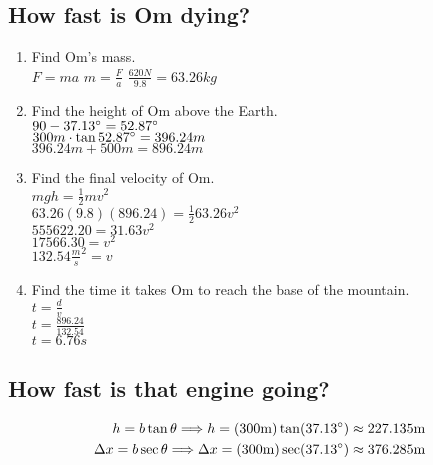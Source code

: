 \documentclass{article}
\begin{document}
\subsection{How fast is Om dying?}
\begin{enumerate}
    \item Find Om's mass. \\
    \(F = ma\)
    \(m =\frac{F}{a}\)
    \(\frac{620N}{9.8}=63.26kg\)

    \item Find the height of Om above the Earth. \\
    \(90-37.13\degree = 52.87\degree\) \\
    \(300m \cdot \tan 52.87\degree = 396.24m\) \\
    \(396.24m + 500m = 896.24m\)

    \item Find the final velocity of Om. \\
    \(mgh = \frac{1}{2}mv^2\) \\
    \(63.26(9.8)(896.24) = \frac{1}{2}63.26v^2\) \\
    \(555622.20 = 31.63v^2\) \\
    \(17566.30 = v^2\) \\
    \(132.54\frac{m}{s}^2 = v\)

    \item Find the time it takes Om to reach the base of the mountain. \\
    \(t = \frac{d}{v}\) \\
    \(t = \frac{896.24}{132.54}\) \\
    \(t = 6.76s\)
\end{enumerate}

\subsection{How fast is that engine going?}


\begin{align*}
    h=b\tan\theta 
    \Longrightarrow h=(300\text{m})\tan(37.13\degree) \approx 227.135\text{m}
    \\
    \Delta x=b\sec\theta
    \Longrightarrow \Delta x=(300\text{m})\sec(37.13\degree) \approx 376.285\text{m}
\end{align*}
\end{document}
